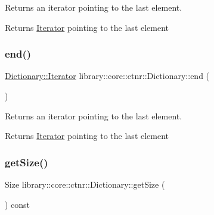 Returns an iterator pointing to the last element. 

\begin{DoxyReturn}{Returns}
\hyperlink{classlibrary_1_1core_1_1ctnr_1_1_dictionary_1_1_iterator}{Iterator} pointing to the last element 
\end{DoxyReturn}
\mbox{\label{classlibrary_1_1core_1_1ctnr_1_1_dictionary_a16ed18981bcf7ffdc7308801cc4b9d56}} 
\subsubsection{\texorpdfstring{end()}{end()}\hspace{0.1cm}{\footnotesize\ttfamily [2/2]}}
{\footnotesize\ttfamily \hyperlink{classlibrary_1_1core_1_1ctnr_1_1_dictionary_1_1_iterator}{Dictionary\+::\+Iterator} library\+::core\+::ctnr\+::\+Dictionary\+::end (\begin{DoxyParamCaption}{ }\end{DoxyParamCaption})}



Returns an iterator pointing to the last element. 

\begin{DoxyReturn}{Returns}
\hyperlink{classlibrary_1_1core_1_1ctnr_1_1_dictionary_1_1_iterator}{Iterator} pointing to the last element 
\end{DoxyReturn}
\mbox{\label{classlibrary_1_1core_1_1ctnr_1_1_dictionary_a54ebf870961949d0f0fbffd6aa62bffa}} 
\subsubsection{\texorpdfstring{get\+Size()}{getSize()}}
{\footnotesize\ttfamily Size library\+::core\+::ctnr\+::\+Dictionary\+::get\+Size (\begin{DoxyParamCaption}{ }\end{DoxyParamCaption}) const}



